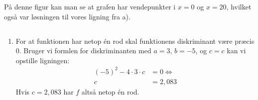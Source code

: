 \documentclass[10pt,a4paper,table]{article}
\begin{document}
På denne figur kan man se at grafen har vendepunkter i $x=0$ og $x=20$, hvilket også var løsningen til vores ligning fra a). 

\subsection{}
\begin{enumerate}
  \item For at funktionen har netop én rod skal funktionens diskriminant være præcis 0. Bruger vi formlen for diskriminanten med $a=3$, $b=-5$, og $c=c$ kan vi opstille ligningen:
    \begin{align*}
      (-5)^2-4\cdot 3\cdot c&=0\Leftrightarrow\\
      c&=2{,}083
    \end{align*}
    Hvis $c=2{,}083$ har $f$ altså netop én rod.
\end{enumerate}
\end{document}
